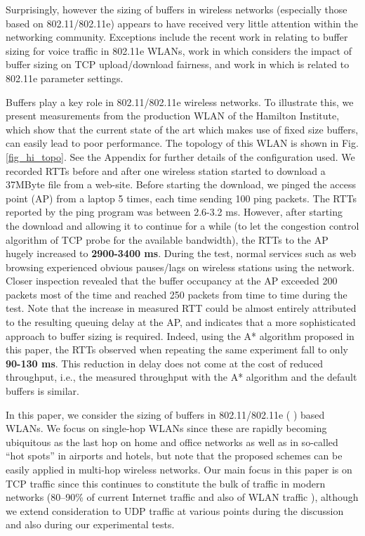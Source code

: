 \documentclass[10pt,twocolumn, journal]{IEEEtran}
\begin{document}
Surprisingly, however the sizing of buffers in wireless networks (especially those based
on 802.11/802.11e) appears to have received very little attention within the networking
community. Exceptions include the recent work in \cite{Malone_BufferSizing_voip}
relating to buffer sizing for voice traffic in 802.11e \cite{802.11e} WLANs, work in
\cite{Pilosof_INFOCOM_2003} which considers the impact of buffer sizing on TCP
upload/download fairness, and work in \cite{Thottan_wicon_2006} which is related to
802.11e parameter settings.

Buffers play a key role in 802.11/802.11e wireless networks. To illustrate this, we
present measurements from the production WLAN of the Hamilton Institute, which
show that the current state of the art which makes use of fixed size buffers, can easily
lead to poor performance. The topology of this WLAN is shown in Fig. \ref{fig_hi_topo}.
See the Appendix for further details of the configuration used. We recorded RTTs before and after one
wireless station started to download a 37MByte file from a web-site. Before starting the
download, we pinged the access point (AP) from a laptop 5 times, each time sending 100 ping packets. The RTTs reported by the ping program was between 2.6-3.2 ms.  However, after starting the
download and allowing it to continue for a while (to let the congestion control algorithm
of TCP probe for the available bandwidth), the RTTs to the AP hugely increased to
\textbf{2900-3400 ms}. During the test, normal services such as web browsing experienced
obvious pauses/lags on wireless stations using the network.  Closer inspection revealed
that the buffer occupancy at the AP exceeded 200 packets most of the time and reached 250
packets from time to time during the test.  Note that the increase in measured RTT could be almost
entirely attributed to the resulting queuing delay at the AP, and indicates that a more sophisticated approach to buffer sizing is required.  Indeed, using the A* algorithm proposed in this
paper, the RTTs observed when repeating the same experiment fall to only \textbf{90-130 ms}. This
reduction in delay does not come at the cost of reduced throughput, i.e., the measured
throughput with the A* algorithm and the default buffers is similar.

In this paper, we consider the sizing of buffers in 802.11/802.11e (\cite{802.11}
\cite{802.11e}) based WLANs. We focus on single-hop WLANs since these are rapidly becoming
ubiquitous as the last hop on home and office networks as well as in so-called ``hot
spots'' in airports and hotels, but note that the proposed schemes can be easily applied
in multi-hop wireless networks. Our main focus in this paper is on TCP traffic since this
continues to constitute the bulk of traffic in modern networks (80--90\%
\cite{Zhao_Ton_2004} of current Internet traffic and also of WLAN traffic
\cite{Tang_MobiCom_2000}), although we extend consideration to UDP traffic at various
points during the discussion and also during our experimental tests.
\end{document}
